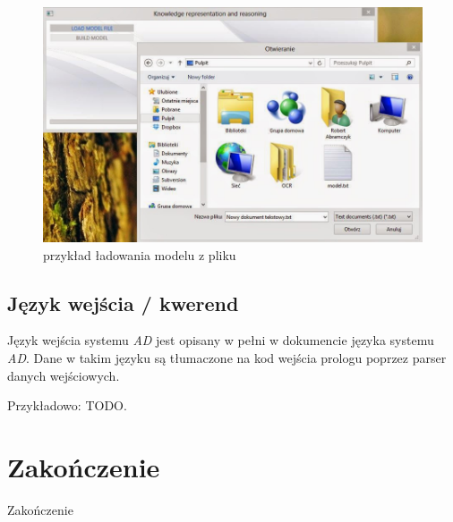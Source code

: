 \documentclass[a4paper]{article}
\begin{document}
        \begin{figure}[p]
            \centering
            \includegraphics[width=\textwidth]{images/acomp_3.jpg}
            \caption{przykład ładowania modelu z pliku}
            \label{fig:acomp3}
        \end{figure}

    \subsection{Język wejścia / kwerend}
    Język wejścia systemu \textit{AD} jest opisany w pełni w dokumencie 
    języka systemu \textit{AD}. Dane w takim języku są tłumaczone na kod
    wejścia prologu poprzez parser danych wejściowych.

    Przykładowo:
        TODO.

\section{Zakończenie}
    Zakończenie
\end{document}
